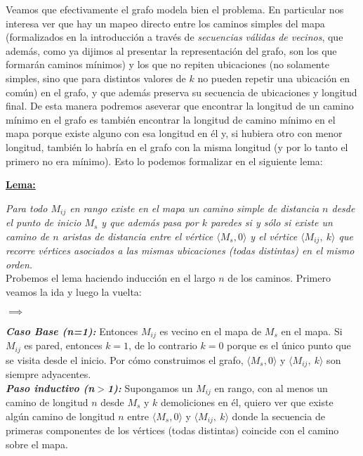     Veamos que efectivamente el grafo modela bien el problema. En particular nos interesa ver que hay un mapeo directo entre los caminos simples del mapa (formalizados en la introducción a través de \emph{secuencias válidas de vecinos}, que además, como ya dijimos al presentar la representación del grafo, son los que formarán caminos mínimos) y los que no repiten ubicaciones (no solamente simples, sino que para distintos valores de $k$ no pueden repetir una ubicación en común) en el grafo, y que además preserva su secuencia de ubicaciones y longitud final. De esta manera podremos aseverar que encontrar la longitud de un camino mínimo en el grafo es también encontrar la longitud de camino mínimo en el mapa porque existe alguno con esa longitud en él y, si hubiera otro con menor longitud, también lo habría en el grafo con la misma longitud (y por lo tanto el primero no era mínimo). Esto lo podemos formalizar en el siguiente lema:
    \\

    \begin{center}\textbf{\underline{Lema:} }\end{center}
        \textit{Para todo $M_{ij}$ en rango existe en el mapa un camino simple de distancia $n$ desde el punto de inicio $M_{s}$ y que además pasa por $k$ paredes si y sólo si existe un camino de $n$ aristas de distancia entre el vértice $\langle {M_s, 0} \rangle$ y el vértice $\langle {M_{ij},\ k} \rangle$  que recorre vértices asociados a las mismas ubicaciones (todas distintas) en el mismo orden.}
    \\

    Probemos el lema haciendo inducción en el largo $n$ de los caminos. Primero veamos la ida y luego la vuelta:

    \begin{center}$\mathbf{\implies}$\end{center}

    \textbf{\emph{Caso Base (n=1): }} Entonces $M_{ij}$ es vecino en el mapa de $M_s$ en el mapa. Si $M_{ij}$ es pared, entonces $k=1$, de lo contrario $k=0$ porque es el único punto que se visita desde el inicio. Por cómo construimos el grafo, $\langle {M_s, 0} \rangle$ y $\langle {M_{ij},\ k} \rangle$ son siempre adyacentes.
    \\

    \textbf{\emph{Paso inductivo (n$>$1): }} Supongamos un $M_{ij}$ en rango, con al menos un camino de longitud $n$ desde $M_s$ y $k$ demoliciones en él, quiero ver que existe algún camino de longitud $n$ entre $\langle {M_s, 0} \rangle$ y $\langle {M_{ij},\ k} \rangle$ donde la secuencia de primeras componentes de los vértices (todas distintas) coincide con el camino sobre el mapa.
    \\

